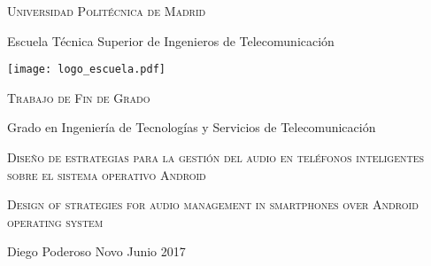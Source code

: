 \begin{titlepage}
	\begin{center}
	
		\large {\textsc{\textsf{Universidad Politécnica de Madrid}}}
		
		\bigskip
		\bigskip
		
		\large {\textsf{Escuela Técnica Superior de Ingenieros de Telecomunicación}}
	
		\bigskip
		\bigskip
		\bigskip

		\texttt{[image: logo\_escuela.pdf]}
		
		\bigskip
		\bigskip
		\bigskip
		
		\large {\textsc{\textsf{Trabajo de Fin de Grado}}}
		
		\bigskip
		\bigskip
		\bigskip
		
		\large {\textsf{Grado en Ingeniería de Tecnologías y Servicios de Telecomunicación}}
		
		\bigskip
		\bigskip
		\bigskip
		\bigskip
		\bigskip
		
		\large {\textsc{\textsf{Diseño de estrategias para la gestión del audio en teléfonos inteligentes sobre el sistema operativo Android}}}
		
		\bigskip
		
		\large {\textsc{\textsf{Design of strategies for audio management in smartphones over Android operating system}}}
		
		\bigskip
		\bigskip
		\bigskip
		\bigskip
		
		\large {Diego Poderoso Novo}
		\linebreak
		\large {Junio 2017}
				
	\end{center}
\end{titlepage}